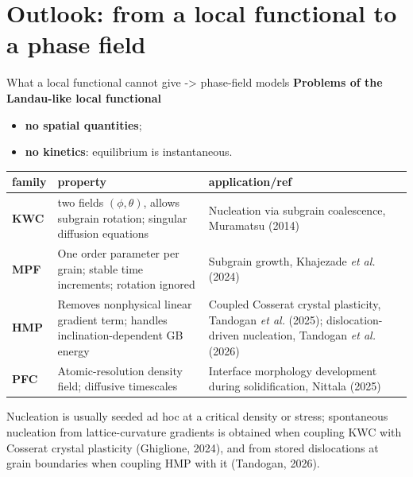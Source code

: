 \documentclass[10pt,aspectratio=169]{beamer}
\begin{document}
\section{Outlook: from a local functional to a phase field}

\begin{frame}{What a local functional cannot give -> phase-field models}
  \textbf{Problems of the Landau-like local functional}
  \small
  \begin{itemize}
    \item \textbf{no spatial quantities};
    \item \textbf{no kinetics}: equilibrium is instantaneous.
  \end{itemize}

  \scriptsize
  \begin{tabular}{p{}p{}p{}}
    \toprule
    family & property & application/ref \\
    \midrule
    \textbf{KWC} 
     & two fields $(\phi,\theta)$, allows subgrain rotation; singular diffusion equations
     & Nucleation via subgrain coalescence, Muramatsu (2014) \\
    \textbf{MPF} 
     & One order parameter per grain; stable time increments; rotation ignored
     & Subgrain growth, Khajezade \emph{et al.} (2024) \\
    \textbf{HMP}
     & Removes nonphysical linear gradient term; handles inclination-dependent GB energy 
     & Coupled Cosserat crystal plasticity, Tandogan \emph{et al.} (2025); dislocation-driven nucleation, Tandogan \emph{et al.} (2026) \\
    \textbf{PFC} 
     & Atomic-resolution density field; diffusive timescales 
     & Interface morphology development during solidification, Nittala (2025) \\
    \bottomrule
  \end{tabular}

  \vspace{0.2em}
  \footnotesize
  Nucleation is usually \alert{seeded ad hoc} at a critical density or stress;
      spontaneous nucleation from lattice-curvature gradients is obtained when coupling KWC
      with Cosserat crystal plasticity (Ghiglione, 2024), and from stored dislocations at
      grain boundaries when coupling HMP with it (Tandogan, 2026).

\end{frame}
\end{document}
